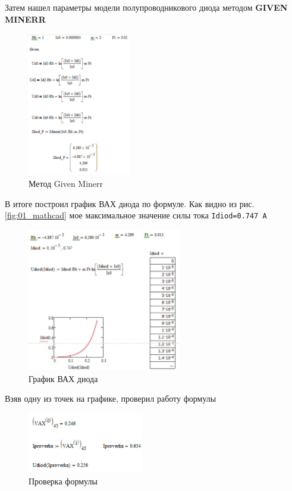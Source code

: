 \newpage
\noindent Затем нашел параметры модели полупроводникового диода методом \textbf{GIVEN MINERR}
\begin{figure}[H]
	\centering
	\includegraphics[width=0.4\textwidth]{img/03_mathcad.jpg}
	\captionsetup{font=footnotesize}
	\caption{Метод Given Minerr}
	\label{fig:03_mathcad}
\end{figure}
\noindent В итоге построил график ВАХ диода по формуле. Как видно из рис.\ref{fig:01_mathcad} мое максимальное значение силы тока \texttt{Idiod=0.747 А}
\begin{figure}[H]
	\centering
	\includegraphics[width=0.6\textwidth]{img/04_mathcad.jpg}
	\captionsetup{font=footnotesize}
	\caption{График ВАХ диода}
	\label{fig:04_mathcad}
\end{figure}

\noindent Взяв одну из точек на графике, проверил работу формулы 
\begin{figure}[H]
	\centering
	\includegraphics[width=0.45\textwidth]{img/05_mathcad.jpg}
	\captionsetup{font=footnotesize}
	\caption{Проверка формулы}
	\label{fig:05mathcad}
\end{figure}

